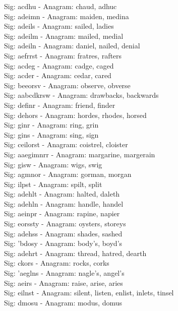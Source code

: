 Sig: {acdhu} - Anagram: chaud, adhuc \\
Sig: {adeimn} - Anagram: maiden, medina \\
Sig: {adeils} - Anagram: sailed, ladies \\
Sig: {adeilm} - Anagram: mailed, medial \\
Sig: {adeiln} - Anagram: daniel, nailed, denial \\
Sig: {aefrrst} - Anagram: fratres, rafters \\
Sig: {acdeg} - Anagram: cadge, caged \\
Sig: {acder} - Anagram: cedar, cared \\
Sig: {beeorsv} - Anagram: observe, obverse \\
Sig: {aabcdkrsw} - Anagram: drawbacks, backwards \\
Sig: {definr} - Anagram: friend, finder \\
Sig: {dehors} - Anagram: hordes, rhodes, horsed \\
Sig: {ginr} - Anagram: ring, grin \\
Sig: {gins} - Anagram: sing, sign \\
Sig: {ceilorst} - Anagram: coistrel, cloister \\
Sig: {aaegimnrr} - Anagram: margarine, margerain \\
Sig: {gisw} - Anagram: wigs, swig \\
Sig: {agmnor} - Anagram: gorman, morgan \\
Sig: {ilpst} - Anagram: spilt, split \\
Sig: {adehlt} - Anagram: halted, daleth \\
Sig: {adehln} - Anagram: handle, handel \\
Sig: {aeinpr} - Anagram: rapine, napier \\
Sig: {eorssty} - Anagram: oysters, storeys \\
Sig: {adehss} - Anagram: shades, sashed \\
Sig: {'bdosy} - Anagram: body's, boyd's \\
Sig: {adehrt} - Anagram: thread, hatred, dearth \\
Sig: {ckors} - Anagram: rocks, corks \\
Sig: {'aeglns} - Anagram: nagle's, angel's \\
Sig: {aeirs} - Anagram: raise, arise, aries \\
Sig: {eilnst} - Anagram: silent, listen, enlist, inlets, tinsel \\
Sig: {dmosu} - Anagram: modus, domus \\

